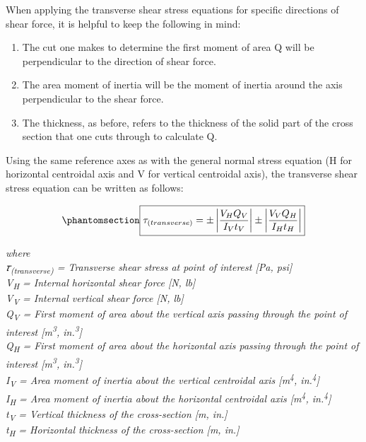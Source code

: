 \documentclass[
  letterpaper,
  DIV=11,
  numbers=noendperiod]{scrreprt}
\providecommand{\tightlist}{%
  \setlength{\itemsep}{0pt}\setlength{\parskip}{0pt}}\usepackage{longtable,booktabs,array}
\theoremstyle{definition}
\theoremstyle{remark}
\begin{document}
When applying the transverse shear stress equations for specific
directions of shear force, it is helpful to keep the following in mind:

\begin{enumerate}
\def\labelenumi{\arabic{enumi}.}
\tightlist
\item
  The cut one makes to determine the first moment of area Q will be
  perpendicular to the direction of shear force.
\item
  The area moment of inertia will be the moment of inertia around the
  axis perpendicular to the shear force.
\item
  The thickness, as before, refers to the thickness of the solid part of
  the cross section that one cuts through to calculate Q.
\end{enumerate}

Using the same reference axes as with the general normal stress equation
(H for horizontal centroidal axis and V for vertical centroidal axis),
the transverse shear stress equation can be written as follows:

\begin{equation}\phantomsection\label{eq-14.3}{
\boxed{\tau_{(transverse)}= \pm\left|\frac{V_H Q_V}{I_V t_V}\right| \pm\left|\frac{V_V Q_H}{I_H t_H}\right|}
}\end{equation}

\emph{where}\\
\emph{𝜏\textsubscript{(transverse)} = Transverse shear stress at point
of interest {[}Pa, psi{]}}\\
\emph{V\textsubscript{H} = Internal horizontal shear force {[}N,
lb{]}}\\
\emph{V\textsubscript{V} = Internal vertical shear force {[}N, lb{]}}\\
\emph{Q\textsubscript{V} = First moment of area about the vertical axis
passing through the point of interest {[}m\textsuperscript{3},
in.\textsuperscript{3}{]}}\\
\emph{Q\textsubscript{H} = First moment of area about the horizontal
axis passing through the point of interest {[}m\textsuperscript{3},
in.\textsuperscript{3}{]}}\\
\emph{I\textsubscript{V} = Area moment of inertia about the vertical
centroidal axis {[}m\textsuperscript{4}, in.\textsuperscript{4}{]}}\\
\emph{I\textsubscript{H} = Area moment of inertia about the horizontal
centroidal axis {[}m\textsuperscript{4}, in.\textsuperscript{4}{]}}\\
\emph{t\textsubscript{V} = Vertical thickness of the cross-section {[}m,
in.{]}}\\
\emph{t\textsubscript{H} = Horizontal thickness of the cross-section
{[}m, in.{]}}
\end{document}
